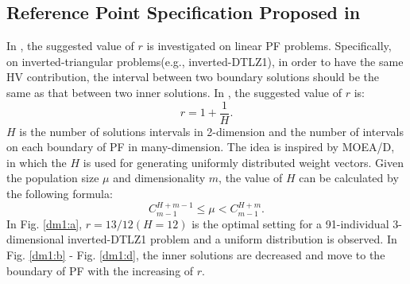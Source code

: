 \documentclass[conference]{IEEEtran}
\begin{document}
\subsection{Reference Point Specification Proposed in \cite{hisao:RPhowtoSpecify}}
In \cite{hisao:RPexplanation, hisao:RPhowtoSpecify, hisao:RPspecify}, the suggested value of $r$ is investigated 
on linear PF problems. 
Specifically, on inverted-triangular problems(e.g., inverted-DTLZ1\cite{hisao:RPexplanation}), 
in order to have the same HV contribution, 
the interval between two boundary solutions should be the same as that between two inner solutions.
In \cite{hisao:RPhowtoSpecify}, the suggested value of $r$ is:
\begin{equation}\label{eod}
  r=1+\frac{1}{H}.
\end{equation}
$H$ is the number of solutions intervals in 2-dimension 
and the number of intervals on each boundary of PF in many-dimension. 
The idea is inspired by MOEA/D\cite{MOEAD}, in which the $H$ is used for 
generating uniformly distributed weight vectors\cite{hisao:dynamic}. 
Given the population size $\mu$ and dimensionality $m$, the value of $H$ can be calculated by the following formula:
\begin{equation}
  C^{H+m-1}_{m-1} \leq \mu < C^{H+m}_{m-1}.
\end{equation}
In Fig. \ref{dm1:a}, $r=13/12(H=12)$ is the optimal setting for a 91-individual 3-dimensional 
inverted-DTLZ1 problem and a uniform distribution is observed. 
In Fig. \ref{dm1:b} - Fig. \ref{dm1:d}, the inner solutions are decreased and move to 
the boundary of PF with the increasing of $r$. 
\end{document}
